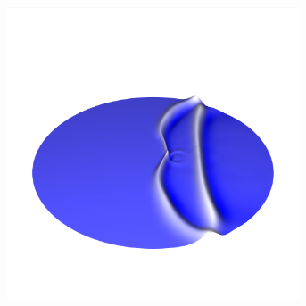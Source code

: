 \documentclass[crop=false,10pt,ngerman]{standalone}
\begin{document}
\begin{figure}[h]
\begin{subfigure}[b]{0.24\textwidth}
          \caption{}
        \end{subfigure}
        \begin{subfigure}[b]{0.24\textwidth}
          \center
          \includegraphics[trim={1.5cm 3.05cm 1.5cm 5.2cm},clip,width=0.95\textwidth]{images/circle_wave_3.png}
          \caption{}
        \end{subfigure}


\end{figure}
\end{document}
